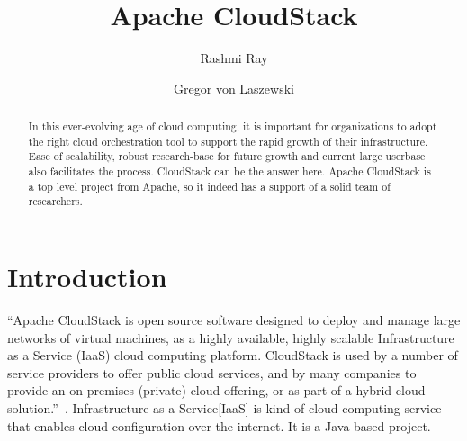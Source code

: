 
\title{Apache CloudStack}


\author{Rashmi Ray}

\author{Gregor von Laszewski}


\renewcommand{\shortauthors}{G. v. Laszewski}


\begin{abstract}

  In this ever-evolving age of cloud computing, it is important for
  organizations to adopt the right cloud orchestration tool to support
  the rapid growth of their infrastructure. Ease of scalability,
  robust research-base for future growth and current large userbase
  also facilitates the process. CloudStack can be the answer
  here. Apache CloudStack is a top level project from Apache, so it
  indeed has a support of a solid team of researchers.

\end{abstract}


\maketitle

\section{Introduction}

``Apache CloudStack is open source software designed to deploy and
manage large networks of virtual machines, as a highly available,
highly scalable Infrastructure as a Service (IaaS) cloud computing
platform. CloudStack is used by a number of service providers to offer
public cloud services, and by many companies to provide an on-premises
(private) cloud offering, or as part of a hybrid cloud
solution.''~\cite{hid-sp18-417-www-cloudstack-intro}.  Infrastructure
as a Service[IaaS] is kind of cloud computing service that enables
cloud configuration over the internet. It is a Java based project.


